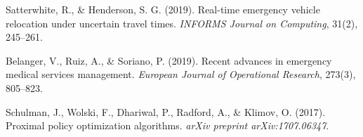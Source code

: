\documentclass[11pt,a4paper]{article}
\begin{document}
\begin{enumerate}[label={[\arabic*]}, leftmargin=*]
    \item Satterwhite, R., \& Henderson, S. G. (2019). Real-time emergency vehicle relocation under uncertain travel times. \emph{INFORMS Journal on Computing}, 31(2), 245--261.
    \item Belanger, V., Ruiz, A., \& Soriano, P. (2019). Recent advances in emergency medical services management. \emph{European Journal of Operational Research}, 273(3), 805--823.
    \item Schulman, J., Wolski, F., Dhariwal, P., Radford, A., \& Klimov, O. (2017). Proximal policy optimization algorithms. \emph{arXiv preprint arXiv:1707.06347}.
\end{enumerate}
\end{document}
